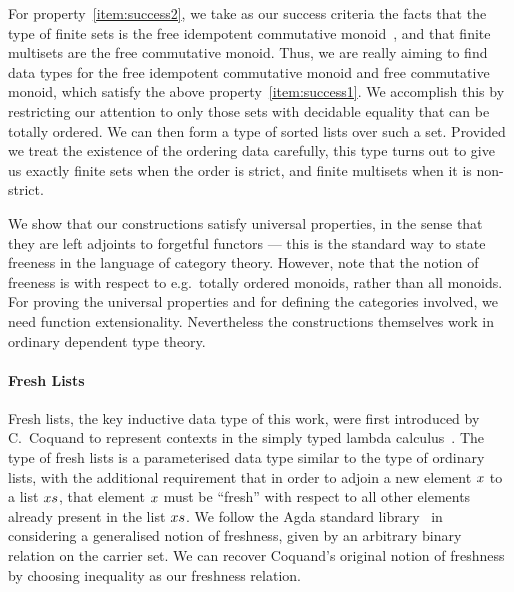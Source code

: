 \documentclass[a4paper]{easychair}
\newcommand\bv[1]{{\AgdaBound{$#1$}}}
\begin{document}
For property~\eqref{item:success2}, we take as our success criteria the facts that
the type of finite sets is the free idempotent commutative monoid~\cite{frumin2018finsetshott},
and that finite multisets are the free commutative monoid.
Thus, we are really aiming to find data types for the free idempotent commutative monoid and free commutative monoid, which satisfy the above property~\eqref{item:success1}.
We accomplish this by restricting our attention to only those sets with decidable equality that can be totally ordered.
We can then form a type of sorted lists over such a set.
Provided we treat the existence of the ordering data carefully, this type turns out to give us exactly finite sets when the order is strict, and finite multisets when it is non-strict.

We show that our constructions satisfy universal properties, in the sense that they are left adjoints to forgetful functors --- this is the standard way to state freeness in the language of category theory.
However, note that the notion of freeness is with respect to e.g.\ totally ordered monoids, rather than all monoids.
For proving the universal properties and for defining the categories involved, we need function extensionality.
Nevertheless the constructions themselves work in ordinary dependent type theory.

\paragraph{Fresh Lists}
Fresh lists, the key inductive data type of this work, were first introduced by C.~Coquand to represent contexts in the simply typed lambda calculus~\cite{ccoquand2002formalstlc}.
The type of fresh lists is a parameterised data type similar to the type of ordinary lists,
with the additional requirement that in order to adjoin
a new element $\bv{x}$ to a list $\bv{xs}$, that element $\bv{x}$ must be ``fresh'' with respect to all other elements already present in the list $\bv{xs}$.
We follow the Agda standard library~\cite{agda-stdlib} in considering a generalised notion of freshness, given by an arbitrary binary relation on the carrier set.
We can recover Coquand's original notion of freshness by choosing inequality as our freshness relation.
\end{document}
